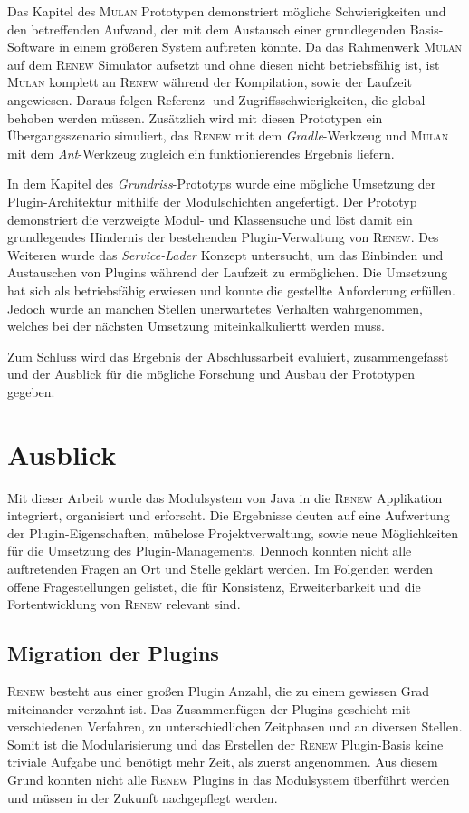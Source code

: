 Das Kapitel des \textsc{Mulan} Prototypen demonstriert mögliche Schwierigkeiten und den betreffenden Aufwand, der mit dem Austausch einer grundlegenden Basis-Software in einem größeren System auftreten könnte. Da das Rahmenwerk \textsc{Mulan} auf dem \textsc{Renew} Simulator aufsetzt und ohne diesen nicht betriebsfähig ist, ist \textsc{Mulan} komplett an \textsc{Renew} während der Kompilation, sowie der Laufzeit angewiesen. Daraus folgen Referenz- und Zugriffsschwierigkeiten, die global behoben werden müssen. Zusätzlich wird mit diesen Prototypen ein Übergangsszenario simuliert, das \textsc{Renew} mit dem \textit{Gradle}-Werkzeug und \textsc{Mulan} mit dem \textit{Ant}-Werkzeug zugleich ein funktionierendes Ergebnis liefern. \bigbreak

In dem Kapitel des \textit{Grundriss}-Prototyps wurde eine mögliche Umsetzung der Plugin-Architektur mithilfe der Modulschichten angefertigt. Der Prototyp demonstriert die verzweigte Modul- und Klassensuche und löst damit ein grundlegendes Hindernis der bestehenden Plugin-Verwaltung von \textsc{Renew}. Des Weiteren wurde das \textit{Service-Lader} Konzept untersucht, um das Einbinden und Austauschen von Plugins während der Laufzeit zu ermöglichen. Die Umsetzung hat sich als betriebsfähig erwiesen und konnte die gestellte Anforderung erfüllen. Jedoch wurde an manchen Stellen unerwartetes Verhalten wahrgenommen, welches bei der nächsten Umsetzung miteinkalkuliertt werden muss. \bigbreak

Zum Schluss wird das Ergebnis der Abschlussarbeit evaluiert, zusammengefasst und der Ausblick für die mögliche Forschung und Ausbau der Prototypen gegeben. 


\section{Ausblick} 
	Mit dieser Arbeit wurde das Modulsystem von Java in die \textsc{Renew} Applikation integriert, organisiert und erforscht. Die Ergebnisse deuten auf eine Aufwertung der Plugin-Eigenschaften, mühelose Projektverwaltung, sowie neue Möglichkeiten für die Umsetzung des Plugin-Managements. Dennoch konnten nicht alle auftretenden Fragen an Ort und Stelle geklärt werden.\bigbreak
	Im Folgenden werden offene Fragestellungen gelistet, die für Konsistenz, Erweiterbarkeit und die Fortentwicklung von \textsc{Renew} relevant sind.  
	
 \subsection*{Migration der Plugins}
	\textsc{Renew} besteht aus einer großen Plugin Anzahl, die zu einem gewissen Grad miteinander verzahnt ist. Das  Zusammenfügen der Plugins geschieht mit verschiedenen Verfahren, zu unterschiedlichen Zeitphasen und an diversen Stellen. Somit ist die Modularisierung und das Erstellen der \textsc{Renew} Plugin-Basis keine triviale Aufgabe und benötigt mehr Zeit, als zuerst angenommen. Aus diesem Grund konnten nicht alle \textsc{Renew} Plugins in das Modulsystem überführt werden und müssen in der Zukunft nachgepflegt werden. 

